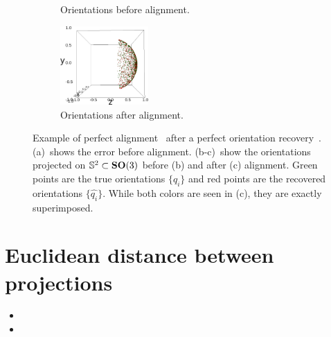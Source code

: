\begin{figure}[ht!]
\begin{minipage}[t]{0.70\linewidth}
\begin{subfigure}[t]{3.4cm}
            \caption{Orientations before alignment.}
        \end{subfigure}
        \hfill
        \begin{subfigure}[t]{3.4cm}
            \centering
            \includegraphics[height=3cm]{figures/coverage_alignment_after.png}
            \caption{Orientations after alignment.}
        \end{subfigure}
        \caption{%
            Example of perfect alignment~ after a perfect orientation recovery~.
            (a)~shows the error before alignment.
            (b-c)~show the orientations projected on $\mathbb{S}^2 \subset \mathrm{\mathbf{SO}}(3)$ before (b) and after (c) alignment.
            Green points are the true orientations $\{q_i\}$ and red points are the recovered orientations $\{\widehat{q_i}\}$.
            While both colors are seen in (c), they are exactly superimposed.
        }\label{fig:5j0n-aa-loss-perfect-distances}
    \end{minipage}
\end{figure}

\section{Euclidean distance between projections}\label{apx:results:distance-estimation}


\begin{itemize}
    \item {}
    \item {}
\end{itemize}

